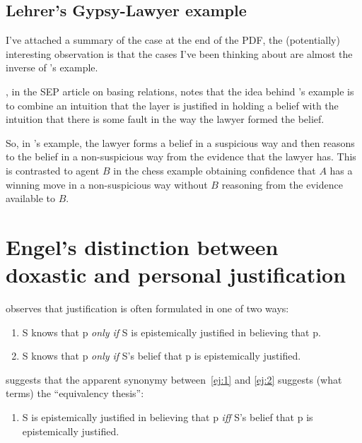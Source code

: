 \documentclass[10pt]{article}
\begin{document}
\subsection{Lehrer's Gypsy-Lawyer example}
\label{sec:lehrers-gypsy-lawyer}

I've attached a summary of the case at the end of the PDF, the (potentially) interesting observation is that the cases I've been thinking about are almost the inverse of \citeauthor{Lehrer:1971aa}'s example.

\citeauthor{Korcz:2019aa}, in the SEP article on basing relations, notes that the idea behind \citeauthor{Lehrer:1971aa}'s example is to combine an intuition that the layer is justified in holding a belief with the intuition that there is some fault in the way the lawyer formed the belief.

So, in \citeauthor{Lehrer:1971aa}'s example, the lawyer forms a belief in a suspicious way and then reasons to the belief in a non-suspicious way from the evidence that the lawyer has.
This is contrasted to agent \(B\) in the chess example obtaining confidence that \(A\) has a winning move in a non-suspicious way without \(B\) reasoning from the evidence available to \(B\).

\section{Engel's distinction between doxastic and personal justification}
\label{sec:engels-dist-betw}

\citeauthor{Engel:1992aa} observes that justification is often formulated in one of two ways:

\begin{enumerate}[label=(JR\arabic*), ref=(JR\arabic*), leftmargin=\parindent*3]
\item\label{ej:1} S knows that p \emph{only if} S is epistemically justified in believing that p.
\item\label{ej:2} S knows that p \emph{only if} S's belief that p is epistemically justified.
\end{enumerate}

\citeauthor{Engel:1992aa} suggests that the apparent synonymy between~\ref{ej:1} and \ref{ej:2} suggests (what \citeauthor{Engel:1992aa} terms) the ``equivalency thesis'':

\begin{enumerate}[label=(ET), leftmargin=\parindent*3]
\item S is epistemically justified in believing that p \emph{iff} S's belief that p is epistemically justified.
\end{enumerate}
\end{document}
